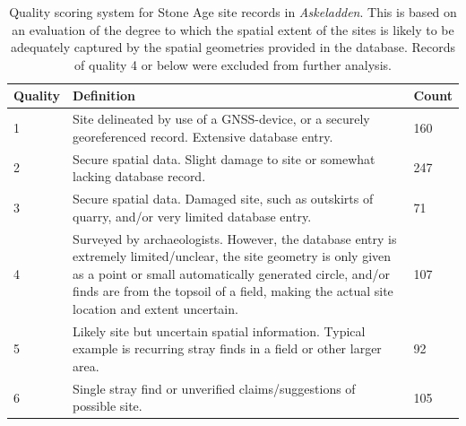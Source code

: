\documentclass[12pt, a4paper]{article}
\begin{document}
\begin{table}
	\begin{center}
		\begin{tabular}{ | l | p{10cm} |  l |}
			\hline
			Quality & Definition & Count \\ \hline
			1 &Site delineated by use of a GNSS-device, or a securely georeferenced record.
			Extensive database entry. & 160 \\ \hline
			2 & Secure spatial data. Slight damage to site or somewhat lacking database record.  & 247 \\ \hline
			3 & Secure spatial data. Damaged site, such as outskirts of quarry,
			and/or very limited database entry.  & 71\\ \hline
			4 &  Surveyed by archaeologists. However, the
			database entry is extremely limited/unclear, the site geometry is only given as
			a point or small automatically generated circle, and/or finds are from the topsoil of a field, making 
			the actual site location and extent uncertain.  & 107 \\ \hline
			5 & Likely site but uncertain spatial information. Typical example
			is recurring stray finds in a field or other larger area.  & 92 \\ \hline
			6 &  Single stray find or unverified claims/suggestions of possible site.  & 105\\ \hline
			\hline
		\end{tabular}
			\caption[Quality scoring system for Stone Age site records in \textit{Askeladden}]{Quality scoring system for Stone Age site records in \textit{Askeladden}. This is based on an evaluation of the degree to which the spatial extent of the sites is likely to be adequately captured by the spatial geometries provided in the database. Records of quality 4 or below were excluded from further analysis.}
		\label{table:askeladden}
	\end{center}
\end{table}
\end{document}
